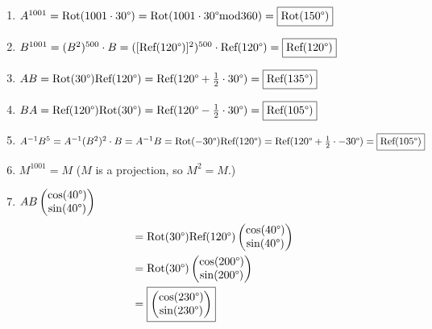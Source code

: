\documentclass[12pt]{article}
\begin{document}
\begin{enumerate}[label=(\alph*)]
	\item $A^{1001} = \text{Rot}(1001 \cdot 30 \degree) =
	\text{Rot}(1001 \cdot 30 \degree \text{mod} 360) =
	\boxed{\text{Rot}(150 \degree)}$
	\item $B^{1001} = (B^2)^{500} \cdot B =
	([\text{Ref}(120 \degree)]^2)^{500} \cdot \text{Ref}(120 \degree) =
	\boxed{\text{Ref}(120 \degree)}$
	\item $AB = \text{Rot}(30 \degree) \text{Ref}(120 \degree) =
	\text{Ref}(120 \degree + \frac{1}{2} \cdot 30 \degree) =
	\boxed{\text{Ref}(135 \degree)}$
	\item $BA = \text{Ref}(120 \degree) \text{Rot}(30 \degree) =
	\text{Ref}(120 \degree - \frac{1}{2} \cdot 30 \degree) =
	\boxed{\text{Ref}(105 \degree)}$
	\item $A^{-1} B^5 = A^{-1} (B^2)^2 \cdot B = A^{-1} B =
	\text{Rot}(-30 \degree) \text{Ref}(120 \degree) = \\
	\text{Ref}(120 \degree + \frac{1}{2} \cdot -30 \degree) =
	\boxed{\text{Ref}(105 \degree)}$
	\item $M^{1001} = \boxed{M}$ \quad ($M$ is a projection, so $M^2 = M$.)
	\item
	$AB \begin{pmatrix} \cos(40 \degree) \\ \sin(40 \degree) \end{pmatrix}$
	\begin{align*}
		&=
		\text{Rot}(30 \degree)
		\text{Ref}(120 \degree)
		\begin{pmatrix} \cos(40 \degree) \\ \sin(40 \degree) \end{pmatrix} \\
		&= 
		\text{Rot}(30 \degree)
		\begin{pmatrix} \cos(200 \degree) \\ \sin(200 \degree) \end{pmatrix}
		\\
		&=
		\boxed{
			\begin{pmatrix}
				\cos(230 \degree) \\ \sin(230 \degree)
			\end{pmatrix}
		}
	\end{align*}
\end{enumerate}
\end{document}
